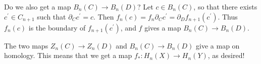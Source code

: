 Do we also get a map $B_n(C)\to B_n(D)$? Let $c\in B_n(C)$, so that there exists $c^\prime \in C_{n+1}$ such that $\partial_C c^\prime = c$. Then $f_n(c) = f_n\partial_C c^\prime = \partial_D f_{n+1}(c^\prime)$. Thus $f_n(c)$ is the boundary of $f_{n+1}(c^\prime)$, and $f$ gives a map $B_n(C)\to B_n(D)$.

The two maps $Z_n(C)\to Z_n(D)$ and $B_n(C)\to B_n(D)$ give a map on homology. This means that we get a map $f_\ast: H_n(X)\to H_n(Y)$, as desired!

